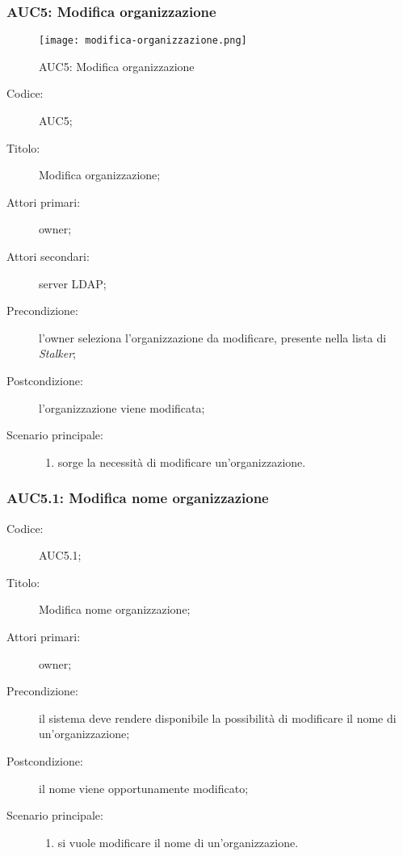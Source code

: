\documentclass[../../../analisi-dei-requisiti.tex]{subfiles}
\begin{document}
\subsubsection{AUC5: Modifica organizzazione}%
\label{subs:AUC5}

\begin{figure}[H]
  \centering
  \texttt{[image: modifica-organizzazione.png]}
  \caption{AUC5: Modifica organizzazione}%
  \label{fig:AUC5}
\end{figure}

\begin{description}
  \item[Codice:] AUC5;
  \item[Titolo:] Modifica organizzazione;
  \item[Attori primari:] owner;
  \item[Attori secondari:] server LDAP\@;
  \item[Precondizione:] l'owner seleziona l'organizzazione da modificare, presente nella lista di \emph{Stalker};
  \item[Postcondizione:] l'organizzazione viene modificata;
  \item[Scenario principale:]
        \begin{enumerate}
          \item sorge la necessità di modificare un'organizzazione.
        \end{enumerate}
\end{description}

\subsubsection{AUC5.1: Modifica nome organizzazione}%
\label{subs:AUC5.1}
\begin{description}
  \item[Codice:] AUC5.1;
  \item[Titolo:] Modifica nome organizzazione;
  \item[Attori primari:] owner;
  \item[Precondizione:] il sistema deve rendere disponibile la possibilità di modificare il nome di un'organizzazione;
  \item[Postcondizione:] il nome viene opportunamente modificato;
  \item[Scenario principale:]
        \begin{enumerate}
          \item si vuole modificare il nome di un'organizzazione.
        \end{enumerate}
\end{description}
\end{document}
